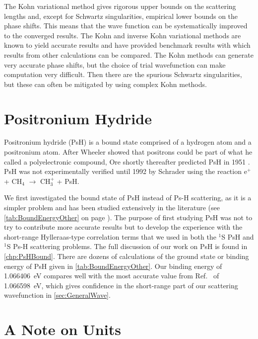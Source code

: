 \documentclass[Dissertation.tex]{subfiles}
\begin{document}
The Kohn variational method gives rigorous upper bounds on the scattering 
lengths and, except for Schwartz singularities, empirical lower bounds on the 
phase shifts. This means that the wave function can be systematically 
improved to the converged results. The Kohn and inverse Kohn variational 
methods are known to yield accurate results and have provided benchmark 
results \cite{VanReeth2003,VanReeth2004} with which results from other 
calculations can be compared. The Kohn methods can generate very accurate 
phase shifts, but the choice of trial wavefunction can make computation very 
difficult. Then there are the spurious Schwartz singularities, but these can 
often be mitigated by using complex Kohn methods.


\section{Positronium Hydride}
\label{sec:PsH}
Positronium hydride (PsH) is a bound state comprised of 
a hydrogen atom and a positronium atom. After Wheeler \cite{Wheeler1946} 
showed that positrons could be part of what he called a polyelectronic 
compound, Ore shortly thereafter predicted PsH in 1951 \cite{Ore1951}. PsH 
was not experimentally verified until 1992 by Schrader \cite{Schrader1992}
using the reaction e$^+$ + CH$_4$ $\to$ CH$_3^+$ + PsH.

We first investigated the bound state of PsH instead of Ps-H scattering, as 
it is a simpler problem and has been studied extensively in the literature
(see \cref{tab:BoundEnergyOther} on page \pageref{tab:BoundEnergyOther}).
The purpose of first studying PsH was not to try to contribute more accurate
results but to develop the experience with the short-range Hylleraas-type 
correlation terms that we used in both the $^1$S PsH and $^1$S Ps-H
scattering problems. 
The full discussion of our work on PsH is found in \cref{chp:PsHBound}.
There are dozens of calculations of the ground state
or binding energy of PsH given in \cref{tab:BoundEnergyOther}.
Our binding energy of \SI{1.066 406}{eV} compares well with the most accurate
value from Ref.~\cite{Bubin2006} of \SI{1.066 598}{eV}, which gives confidence
in the short-range part of our scattering wavefunction in
\cref{sec:GeneralWave}.


\section{A Note on Units}
\label{sec:Units}
\end{document}
